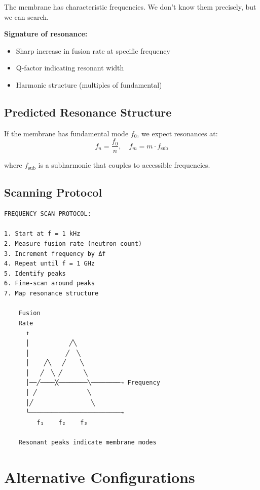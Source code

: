 \documentclass[12pt,a4paper]{article}
\begin{document}
The membrane has characteristic frequencies. We don't know them precisely, but we can search.

\textbf{Signature of resonance:}
\begin{itemize}
    \item Sharp increase in fusion rate at specific frequency
    \item Q-factor indicating resonant width
    \item Harmonic structure (multiples of fundamental)
\end{itemize}

\subsection{Predicted Resonance Structure}

If the membrane has fundamental mode $f_0$, we expect resonances at:
\begin{equation}
f_n = \frac{f_0}{n}, \quad f_m = m \cdot f_{\text{sub}}
\end{equation}

where $f_{\text{sub}}$ is a subharmonic that couples to accessible frequencies.

\subsection{Scanning Protocol}

\begin{verbatim}
FREQUENCY SCAN PROTOCOL:

1. Start at f = 1 kHz
2. Measure fusion rate (neutron count)
3. Increment frequency by Δf
4. Repeat until f = 1 GHz
5. Identify peaks
6. Fine-scan around peaks
7. Map resonance structure

    Fusion
    Rate
      ↑
      │           ╱╲
      │          ╱  ╲
      │    ╱╲   ╱    ╲
      │   ╱  ╲ ╱      ╲
      │──╱────╳────────╲────────→ Frequency
      │ ╱              ╲
      │╱                ╲
      └─────────────────────────→
         f₁    f₂    f₃
         
    Resonant peaks indicate membrane modes
\end{verbatim}

\section{Alternative Configurations}
\end{document}
